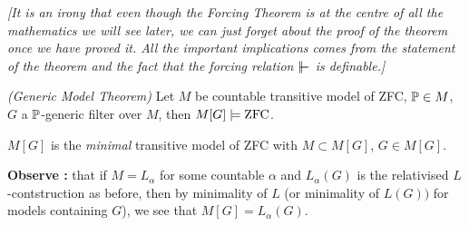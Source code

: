 \documentclass[12pt,a4paper]{article}
\begin{document}
\emph{[It is an irony that even though the Forcing Theorem is at the centre of all the mathematics we will see later, we can just forget about the proof of the theorem once we have proved it. All the important implications comes from the statement of the theorem and the fact that the forcing relation $\forces$ is definable.]}
\s

\thm \emph{(Generic Model Theorem)} Let $M$ be countable transitive model of ZFC, $\mathbb{P} \in M$, $G$ a $\mathbb{P}$-generic filter over $M$, then $M[G] \models \text{ZFC}$.
\s

\corr $M[G]$ is the \emph{minimal} transitive model of ZFC with $M\subset M[G]$, $G\in M[G]$.
\s

\textbf{Observe :} that if $M = L_{\alpha}$  for some countable $\alpha$ and $L_{\alpha}(G)$ is the relativised $L$-contstruction as before, then by minimality of $L$ (or minimality of $L(G))$ for models containing $G$), we see that $M[G] = L_{\alpha}(G)$. 
\s
\end{document}
